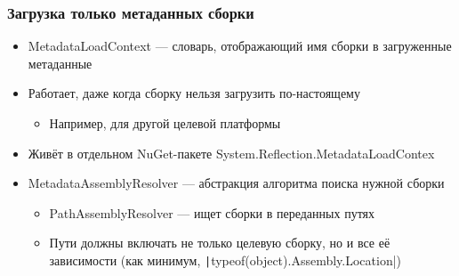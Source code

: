 \documentclass{../../slides-style}
\begin{document}
    \begin{frame}[fragile]
        \frametitle{Загрузка только метаданных сборки}
        \begin{itemize}
            \item MetadataLoadContext --- словарь, отображающий имя сборки в загруженные метаданные
            \item Работает, даже когда сборку нельзя загрузить по-настоящему
            \begin{itemize}
                \item Например, для другой целевой платформы
            \end{itemize}
            \item Живёт в отдельном NuGet-пакете System.Reflection.MetadataLoadContex
            \item MetadataAssemblyResolver --- абстракция алгоритма поиска нужной сборки
            \begin{itemize}
                \item PathAssemblyResolver --- ищет сборки в переданных путях
                \item Пути должны включать не только целевую сборку, но и все её зависимости (как минимум, \texttt|typeof(object).Assembly.Location|)
            \end{itemize}
        \end{itemize}
    \end{frame}
\end{document}
